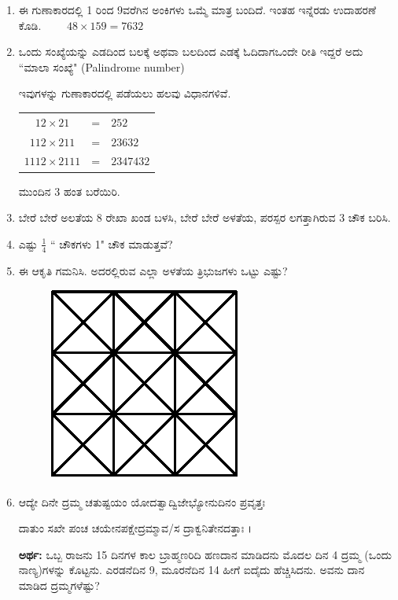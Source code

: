 \begin{enumerate}
\item ಈ ಗುಣಾಕಾರದಲ್ಲಿ 1 ರಿಂದ 9ವರೆಗಿನ ಅಂಕಿಗಳು ಒಮ್ಮೆ ಮಾತ್ರ ಬಂದಿದೆ. ಇಂತಹ ಇನ್ನೆರಡು ಉದಾಹರಣೆ ಕೊಡಿ. $\qquad 48\times 159 = 7632$


\item ಒಂದು ಸಂಖ್ಯೆಯನ್ನು ಎಡದಿಂದ ಬಲಕ್ಕೆ ಅಥವಾ ಬಲದಿಂದ ಎಡಕ್ಕೆ ಓದಿದಾಗ\break ಒಂದೇ ರೀತಿ ಇದ್ದರೆ ಅದು ``ಮಾಲಾ ಸಂಖ್ಯೆ" (Palindrome number)

ಇವುಗಳನ್ನು ಗುಣಾಕಾರದಲ್ಲಿ ಪಡೆಯಲು ಹಲವು ವಿಧಾನಗಳಿವೆ. 

\begin{tabular}[t]{ccl}
$12\times 21$ & = & $252$\\
$112\times 211$ & = & $23632$\\
$1112\times 2111$ & = & $2347432$
\end{tabular}

\vskip 0.1cm

ಮುಂದಿನ 3 ಹಂತ ಬರೆಯಿರಿ. 

\item ಬೇರೆ ಬೇರೆ ಅಲತೆಯ 8 ರೇಖಾ ಖಂಡ ಬಳಸಿ, ಬೇರೆ ಬೇರೆ ಅಳತೆಯ, ಪರಸ್ಪರ ಲಗತ್ತಾಗಿರುವ 3 ಚೌಕ ಬರಿಸಿ.

\item ಎಷ್ಟು $\frac{1}{4}$ `` ಚೌಕಗಳು 1" ಚೌಕ ಮಾಡುತ್ತವೆ? 

\item ಈ ಆಕೃತಿ ಗಮನಿಸಿ. ಅದರಲ್ಲಿರುವ ಎಲ್ಲಾ ಅಳತೆಯ ತ್ರಿಭುಜಗಳು ಒಟ್ಟು ಎಷ್ಟು? 

\begin{figure}[H]
\centering
\includegraphics[scale=1.3]{images/chap8/q20.eps}
\end{figure}

\item ಆದ್ಯೇ ದಿನೇ ದ್ರಮ್ಮ ಚತುಷ್ಟಯಂ ಯೋದತ್ವಾದ್ವಿಜೇಭ್ಯೋನುದಿನಂ ಪ್ರವೃತ್ತಃ 

ದಾತುಂ ಸಖೇ ಪಂಚ ಚಯೇನಪಕ್ಷೇದ್ರಮ್ಮಾವ/ಸ ದ್ರಾಕ್ವನಿತೇನದತ್ತಾಃ ।

\eject

{\bf ಅರ್ಥ:} ಒಬ್ಬ ರಾಜನು 15 ದಿನಗಳ ಕಾಲ ಬ್ರಾಹ್ಮಣರಿದಿ ಹಣದಾನ ಮಾಡಿದನು ಮೊದಲ ದಿನ 4 ದ್ರಮ್ಮ (ಒಂದು ನಾಣ್ಯ)ಗಳನ್ನು ಕೊಟ್ಟನು. ಎರಡನೆದಿನ 9, ಮೂರನೆದಿನ 14 ಹೀಗೆ ಐದೈದು ಹೆಚ್ಚಿಸಿದನು. ಅವನು ದಾನ ಮಾಡಿದ ದ್ರಮ್ಮಗಳೆಷ್ಟು? 


\end{enumerate}
